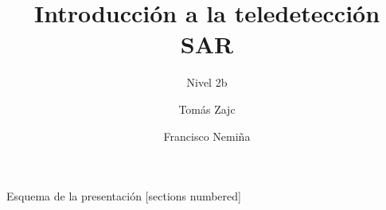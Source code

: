 \documentclass[handout,aspectratio=169]{beamer}
\title{Introducción a la teledetección SAR}
\subtitle{Nivel 2b}
\author{Tomás Zajc \and Francisco Nemiña}
\institute{SAOCOM \\ Comisión Nacional de Actividades Espaciales}
\date{}
\begin{document}
\maketitle

\begin{frame}{Esquema de la presentación}
  [sections numbered]
  \tableofcontents[hideallsubsections]
\end{frame}






\end{document}
